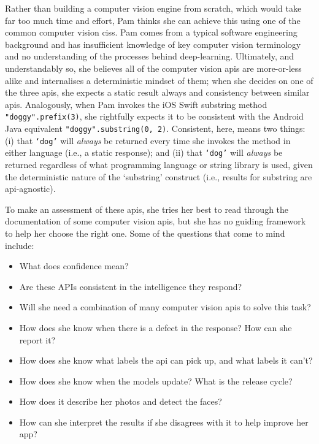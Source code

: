 Rather than building a computer vision engine from scratch, which would take far too much time and effort, Pam thinks she can achieve this using one of the common computer vision \glspl{cis}. Pam comes from a typical software engineering background and has insufficient knowledge of key computer vision terminology and no understanding of the processes behind deep-learning. Ultimately, and understandably so, she believes all of the computer vision \glspl{api} are more-or-less alike and internalises a deterministic mindset of them; when she decides on one of the three \glspl{api}, she expects a static result always and consistency between similar \glspl{api}. Analogously, when Pam invokes the iOS Swift substring method \texttt{"doggy".prefix(3)}, she rightfully expects it to be consistent with the Android Java equivalent \texttt{"doggy".substring(0, 2)}. Consistent, here, means two things: (i) that \texttt{`dog'} will \textit{always} be returned every time she invokes the method in either language (i.e., a static response); and (ii) that \texttt{`dog'} will \textit{always} be returned regardless of what programming language or string library is used, given the deterministic nature of the `substring' construct (i.e., results for substring are \gls{api}-agnostic).

To make an assessment of these \glspl{api}, she tries her best to read through the documentation of some computer vision \glspl{api}, but she has no guiding framework to help her choose the right one. Some of the questions that come to mind include:

\begin{itemize}
  \item What does confidence mean? 
  \item Are these APIs consistent in the intelligence they respond?
  \item Will she need a combination of many computer vision \glspl{api} to solve this task?
  \item How does she know when there is a defect in the response? How can she report it?
  \item How does she know what labels the \gls{api} can pick up, and what labels it can't?
  \item How does she know when the models update? What is the release cycle?
  \item How does it describe her photos and detect the faces?
  \item How can she interpret the results if she disagrees with it to help improve her app?
\end{itemize}

